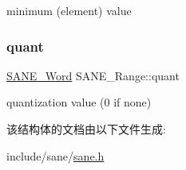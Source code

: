 minimum (element) value \mbox{\label{structSANE__Range_a88ea83dce447e4edfc7dc60867d038e4}} 
\subsubsection{\texorpdfstring{quant}{quant}}
{\footnotesize\ttfamily \hyperlink{sane_8h_aa65d63e57d37984b9d873811a7544b4a}{S\+A\+N\+E\+\_\+\+Word} S\+A\+N\+E\+\_\+\+Range\+::quant}

quantization value (0 if none) 

该结构体的文档由以下文件生成\+:\begin{DoxyCompactItemize}
\item 
include/sane/\hyperlink{sane_8h}{sane.\+h}\end{DoxyCompactItemize}
